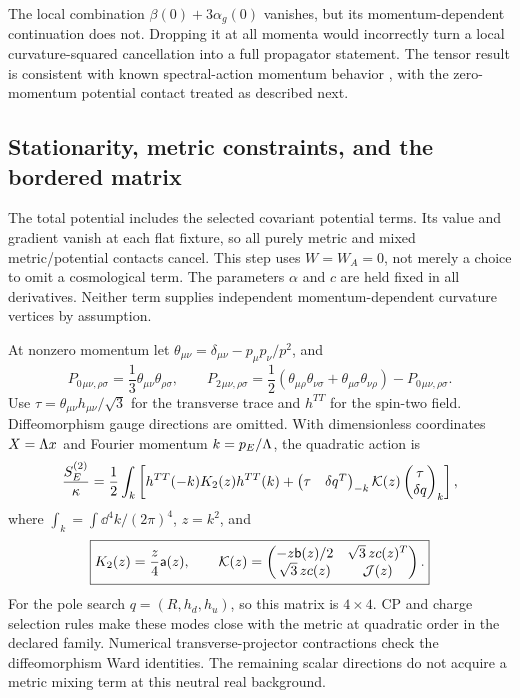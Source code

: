 The local combination $\beta(0)+3\alpha_g(0)$ vanishes, but its momentum-dependent continuation does not. Dropping it at all momenta would incorrectly turn a local curvature-squared cancellation into a full propagator statement. The tensor result is consistent with known spectral-action momentum behavior \cite{KLV,ASZ}, with the zero-momentum potential contact treated as described next.

\subsection{Stationarity, metric constraints, and the bordered matrix}

The total potential includes the selected covariant potential terms. Its value and gradient vanish at each flat fixture, so all purely metric and mixed metric/potential contacts cancel. This step uses $W=W_A=0$, not merely a choice to omit a cosmological term. The parameters $\alpha$ and $c$ are held fixed in all derivatives. Neither term supplies independent momentum-dependent curvature vertices by assumption.

At nonzero momentum let $\theta_{\mu\nu}=\delta_{\mu\nu}-p_\mu p_\nu/p^2$, and
\begin{equation}
 P_0{}_{\mu\nu,\rho\sigma}=\frac13\theta_{\mu\nu}\theta_{\rho\sigma},\qquad
 P_2{}_{\mu\nu,\rho\sigma}=\frac12(\theta_{\mu\rho}\theta_{\nu\sigma}+\theta_{\mu\sigma}\theta_{\nu\rho})-P_0{}_{\mu\nu,\rho\sigma}.
\end{equation}
Use $\tau=\theta_{\mu\nu}h_{\mu\nu}/\sqrt3$ for the transverse trace and $h^{TT}$ for the spin-two field. Diffeomorphism gauge directions are omitted. With dimensionless coordinates $X=\Lambda x$ and Fourier momentum $k=p_E/\Lambda$, the quadratic action is
\begin{equation}
 \frac{S_E^{(2)}}{\kappa}=\frac12\int_k
 \left[h^{TT}(-k)K_2(z)h^{TT}(k)+
 \begin{pmatrix}\tau&\delta q^T\end{pmatrix}_{-k}
 \mathcal K(z)\begin{pmatrix}\tau\\\delta q\end{pmatrix}_{k}\right],
\end{equation}
where $\int_k=\int\dd^4k/(2\pi)^4$, $z=k^2$, and
\begin{equation}
 \boxed{K_2(z)=\frac z4\mathsf a(z),\qquad
 \mathcal K(z)=\begin{pmatrix}
 -z\mathsf b(z)/2&\sqrt3\,z c(z)^T\\
 \sqrt3\,z c(z)&\mathcal J(z)
 \end{pmatrix}.}\label{eq:K}
\end{equation}
For the pole search $q=(R,h_d,h_u)$, so this matrix is $4\times4$. CP and charge selection rules make these modes close with the metric at quadratic order in the declared family. Numerical transverse-projector contractions check the diffeomorphism Ward identities. The remaining scalar directions do not acquire a metric mixing term at this neutral real background.

